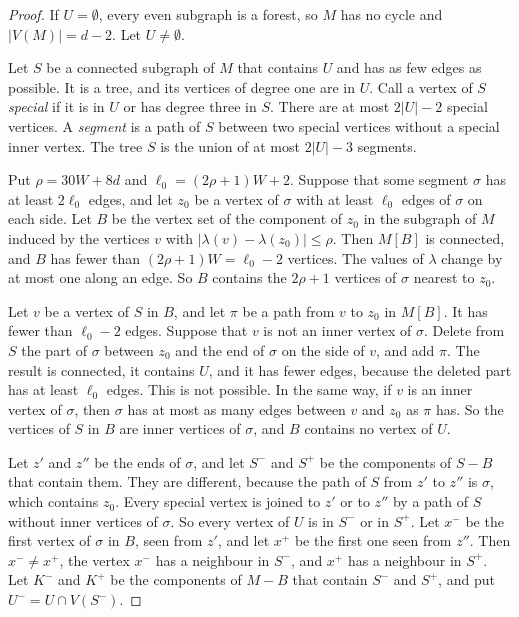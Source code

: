 \documentclass[11pt]{article}
\begin{document}
\begin{proof}
If $U=\emptyset$, every even subgraph is a forest, so $M$ has no cycle and $|V(M)|=d-2$. Let
$U\ne\emptyset$.

 Let $S$ be a connected subgraph of $M$ that contains $U$ and has as few edges as
possible. It is a tree, and its vertices of degree one are in $U$. Call a vertex of $S$
\emph{special} if it is in $U$ or has degree three in $S$. There are at most $2|U|-2$ special
vertices. A \emph{segment} is a path of $S$ between two special vertices without a special inner
vertex. The tree $S$ is the union of at most $2|U|-3$ segments.

 Put $\rho=30W+8d$ and $\ell_0=(2\rho+1)W+2$. Suppose that
some segment $\sigma$ has at least $2\ell_0$ edges, and let $z_0$ be a vertex of $\sigma$ with at
least $\ell_0$ edges of $\sigma$ on each side. Let $B$ be the vertex set of the component of
$z_0$ in the subgraph of $M$ induced by the vertices $v$ with $|\lambda(v)-\lambda(z_0)|\le\rho$.
Then $M[B]$ is connected, and $B$ has fewer than $(2\rho+1)W=\ell_0-2$ vertices. The values of
$\lambda$ change by at most one along an edge. So $B$ contains the $2\rho+1$ vertices of
$\sigma$ nearest to $z_0$.

 Let $v$ be a vertex of $S$ in $B$, and let
$\pi$ be a path from $v$ to $z_0$ in $M[B]$. It has fewer than $\ell_0-2$ edges. Suppose that
$v$ is not an inner vertex of $\sigma$. Delete from $S$ the part of $\sigma$ between $z_0$ and
the end of $\sigma$ on the side of $v$, and add $\pi$. The result is connected, it contains $U$,
and it has fewer edges, because the deleted part has at least $\ell_0$ edges. This is not
possible. In the same way, if $v$ is an inner vertex of $\sigma$, then $\sigma$ has at most as
many edges between $v$ and $z_0$ as $\pi$ has. So the vertices of $S$ in $B$ are inner vertices
of $\sigma$, and $B$ contains no vertex of $U$.

Let $z'$ and $z''$ be the ends of $\sigma$, and let $S^{-}$ and $S^{+}$ be the components of
$S-B$ that contain them. They are different, because the path of $S$ from $z'$ to $z''$ is
$\sigma$, which contains $z_0$. Every special vertex is joined to $z'$ or to $z''$ by a path of
$S$ without inner vertices of $\sigma$. So every vertex of $U$ is in $S^{-}$ or in $S^{+}$. Let
$x^{-}$ be the first vertex of $\sigma$ in $B$, seen from $z'$, and let $x^{+}$ be the first one
seen from $z''$. Then $x^{-}\ne x^{+}$, the vertex $x^{-}$ has a neighbour in $S^{-}$, and
$x^{+}$ has a neighbour in $S^{+}$. Let $K^{-}$ and $K^{+}$ be the components of $M-B$ that
contain $S^{-}$ and $S^{+}$, and put $U^{-}=U\cap V(S^{-})$.


\end{proof}
\end{document}
